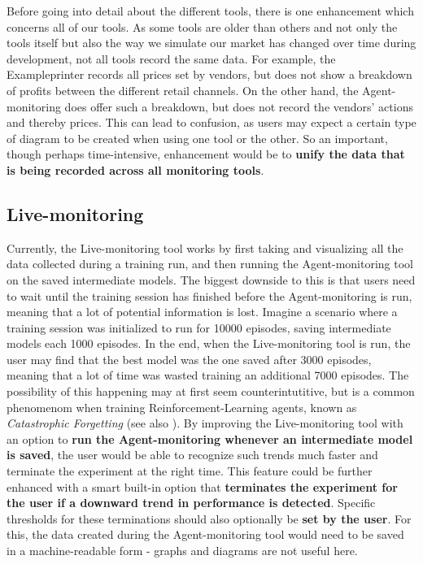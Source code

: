 Before going into detail about the different tools, there is one enhancement which concerns all of our tools. As some tools are older than others and not only the tools itself but also the way we simulate our market has changed over time during development, not all tools record the same data. For example, the Exampleprinter records all prices set by vendors, but does not show a breakdown of profits between the different retail channels. On the other hand, the Agent-monitoring does offer such a breakdown, but does not record the vendors' actions and thereby prices. This can lead to confusion, as users may expect a certain type of diagram to be created when using one tool or the other. So an important, though perhaps time-intensive, enhancement would be to \textbf{unify the data that is being recorded across all monitoring tools}.

\subsection*{Live-monitoring}\label{subsec:FutureLiveMonitoring}

Currently, the Live-monitoring tool works by first taking and visualizing all the data collected during a training run, and then running the Agent-monitoring tool on the saved intermediate models. The biggest downside to this is that users need to wait until the training session has finished before the Agent-monitoring is run, meaning that a lot of potential information is lost. Imagine a scenario where a training session was initialized to run for 10000 episodes, saving intermediate models each 1000 episodes. In the end, when the Live-monitoring tool is run, the user may find that the best model was the one saved after 3000 episodes, meaning that a lot of time was wasted training an additional 7000 episodes. The possibility of this happening may at first seem counterintutitive, but is a common phenomenom when training Reinforcement-Learning agents, known as \emph{Catastrophic Forgetting} (see also \cite{CatastrophicForgetting}). By improving the Live-monitoring tool with an option to \textbf{run the Agent-monitoring whenever an intermediate model is saved}, the user would be able to recognize such trends much faster and terminate the experiment at the right time. This feature could be further enhanced with a smart built-in option that \textbf{terminates the experiment for the user if a downward trend in performance is detected}. Specific thresholds for these terminations should also optionally be \textbf{set by the user}. For this, the data created during the Agent-monitoring tool would need to be saved in a machine-readable form - graphs and diagrams are not useful here.

